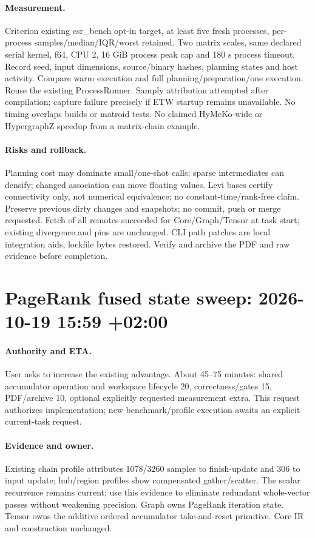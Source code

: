 \documentclass[11pt,a4paper]{article}
\begin{document}
\paragraph{Measurement.} Criterion existing csr\_bench opt-in target, at least five fresh
processes, per-process samples/median/IQR/worst retained. Two matrix scales, same declared
serial kernel, f64, CPU 2, 16 GiB process peak cap and 180 s process timeout. Record seed,
input dimensions, source/binary hashes, planning states and host activity. Compare warm
execution and full planning/preparation/one execution. Reuse the existing ProcessRunner.
Samply attribution attempted after compilation; capture failure precisely if ETW startup
remains unavailable. No timing overlaps builds or matroid tests. No claimed HyMeKo-wide
or HypergraphZ speedup from a matrix-chain example.
\paragraph{Risks and rollback.} Planning cost may dominate small/one-shot calls; sparse
intermediates can densify; changed association can move floating values. Levi bases certify connectivity only, not numerical equivalence; no
constant-time/rank-free claim. Preserve previous dirty changes and snapshots; no commit,
push or merge requested. Fetch of all remotes succeeded for Core/Graph/Tensor at task start;
existing divergence and pins are unchanged. CLI path patches are local integration aids,
lockfile bytes restored. Verify and archive the PDF and raw evidence before completion.


\clearpage\section*{PageRank fused state sweep: 2026-10-19 15:59 +02:00}
\paragraph{Authority and ETA.} User asks to increase the existing advantage. About 45--75
minutes: shared accumulator operation and workspace lifecycle 20, correctness/gates 15,
PDF/archive 10, optional explicitly requested measurement extra. This request authorizes
implementation; new benchmark/profile execution awaits an explicit current-task request.
\paragraph{Evidence and owner.} Existing chain profile attributes 1078/3260 samples to
finish-update and 306 to input update; hub/region profiles show compensated gather/scatter.
The scalar recurrence remains current; use this evidence to eliminate redundant whole-vector
passes without weakening precision. Graph owns PageRank iteration state. Tensor owns the
additive ordered accumulator take-and-reset primitive. Core IR and construction unchanged.
\end{document}
